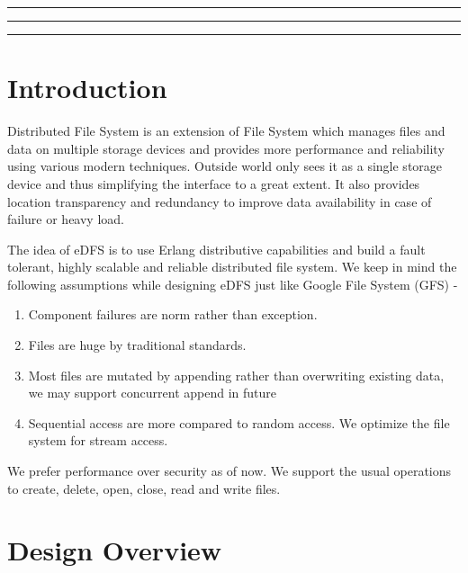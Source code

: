 \documentclass[a4paper,12pt]{article}
\begin{document}

\tableofcontents
\vspace{0.5cm}
\hrule \hrule \hrule
\newpage

\section{Introduction}
Distributed File System is an extension of File System which manages files and data on multiple storage devices and provides more performance and reliability using various modern techniques. Outside world only sees it as a single storage device and thus simplifying the interface to a great extent. It also provides location transparency and redundancy to improve data availability in case of failure or heavy load.

The idea of eDFS is to use Erlang distributive capabilities and build a fault tolerant, highly scalable and reliable distributed file system. We keep in mind the following assumptions while designing eDFS just like Google File System (GFS) \cite{ghemawat03} -
\begin{enumerate}
\item Component failures are norm rather than exception.
\item Files are huge by traditional standards.
\item Most files are mutated by appending rather than overwriting existing data, we may support concurrent append in future
\item Sequential access are more compared to random access. We optimize the file system for stream access.
\end{enumerate}

We prefer performance over security as of now. We support the usual operations to create, delete, open, close, read and write files.

\section{Design Overview}
\end{document}
